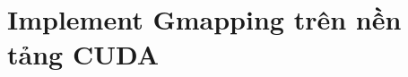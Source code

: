 \documentclass[../../main.tex]{subfiles}
\begin{document}
\graphicspath{{imgs/}{05_software/imgs/}}

\chapter{Implement Gmapping trên nền tảng CUDA}
\end{document}
